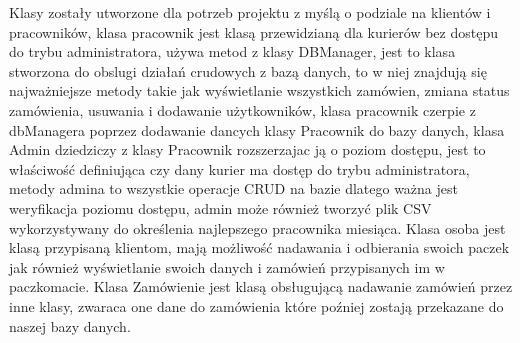 Klasy zostały utworzone dla potrzeb projektu z myślą o podziale na klientów i pracowników, klasa pracownik jest klasą przewidzianą dla kurierów bez dostępu do trybu administratora, używa metod z klasy DBManager, jest to klasa stworzona do obslugi działań crudowych z bazą danych, to w niej znajdują się najważniejsze metody takie jak wyświetlanie wszystkich zamówien, zmiana status zamówienia, usuwania i dodawanie użytkowników, klasa pracownik czerpie z dbManagera poprzez dodawanie dancych klasy Pracownik do bazy danych, klasa Admin dziedziczy z klasy Pracownik rozszerzajac ją o poziom dostępu, jest to właściwość definiująca czy dany kurier ma dostęp do trybu administratora, metody admina to wszystkie operacje CRUD na bazie dlatego ważna jest weryfikacja poziomu dostępu, admin może również tworzyć plik CSV wykorzystywany do określenia najlepszego pracownika miesiąca. Klasa osoba jest klasą przypisaną klientom, mają możliwość nadawania i odbierania swoich paczek jak również wyświetlanie swoich danych i zamówień
przypisanych im w paczkomacie. Klasa Zamówienie jest klasą obsługującą nadawanie zamówień przez inne klasy, zwaraca one dane do zamówienia które poźniej zostają przekazane do naszej bazy danych.